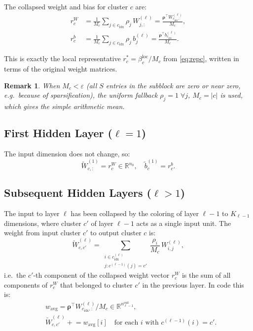 \documentclass[11pt]{article}
\newtheorem{remark}{Remark}
\begin{document}
The collapsed weight and bias for cluster $c$ are:
\begin{align}
  r_c^W &= \frac{1}{M_c}\sum_{j\in c_{\mathrm{idx}}} \rho_j\,W^{(\ell)}_{j,:}
         = \frac{\bm{\rho}^\top W^{(\ell)}_{c_{\mathrm{idx}},:}}{M_c},
  \label{eq:rW}\\
  r_c^b &= \frac{1}{M_c}\sum_{j\in c_{\mathrm{idx}}} \rho_j\,b^{(\ell)}_j
         = \frac{\bm{\rho}^\top b^{(\ell)}_{c_{\mathrm{idx}}}}{M_c}.
  \label{eq:rb}
\end{align}

This is exactly the local representative $r_c^* = \beta_c^{\mathrm{loc}}/M_c$
from \eqref{eq:repc}, written in terms of the original weight matrices.

\begin{remark}
When $M_c < \varepsilon$ (all $S$ entries in the subblock are zero or near
zero, e.g.\ because of sparsification), the uniform fallback
$\rho_j = 1\;\forall j$, $M_c = |c|$ is used, which gives the simple
arithmetic mean.
\end{remark}

\subsection{First Hidden Layer ($\ell = 1$)}

The input dimension does not change, so:
\[
  \widetilde{W}^{(1)}_{c,:} = r_c^W \in \mathbb{R}^{n_0},
  \quad
  \widetilde{b}^{(1)}_c = r_c^b.
\]

\subsection{Subsequent Hidden Layers ($\ell > 1$)}

The input to layer $\ell$ has been collapsed by the coloring of layer $\ell-1$
to $K_{\ell-1}$ dimensions, where cluster $c'$ of layer $\ell-1$ acts as a
single input unit. The weight from input cluster $c'$ to output cluster $c$ is:
\begin{equation}
  \widetilde{W}^{(\ell)}_{c, c'} = \sum_{\substack{i \in c_{\mathrm{idx}}^{(\ell)} \\ j : c^{(\ell-1)}(j) = c'}}
  \frac{\rho_i}{M_c}\,W^{(\ell)}_{i, j},
  \label{eq:W_cross}
\end{equation}
i.e.\ the $c'$-th component of the collapsed weight vector $r_c^W$ is the
sum of all components of $r_c^W$ that belonged to cluster $c'$ in the
previous layer. In code this is:
\begin{align*}
  &w_{\mathrm{avg}} = \bm{\rho}^\top W^{(\ell)}_{c_{\mathrm{idx}},:} / M_c
   \in \mathbb{R}^{n_{\ell-1}^{\mathrm{out}}}, \\
  &\widetilde{W}^{(\ell)}_{c, c'} \mathrel{+}= w_{\mathrm{avg}}[i]
   \quad\text{for each }i\text{ with }c^{(\ell-1)}(i) = c'.
\end{align*}
\end{document}
